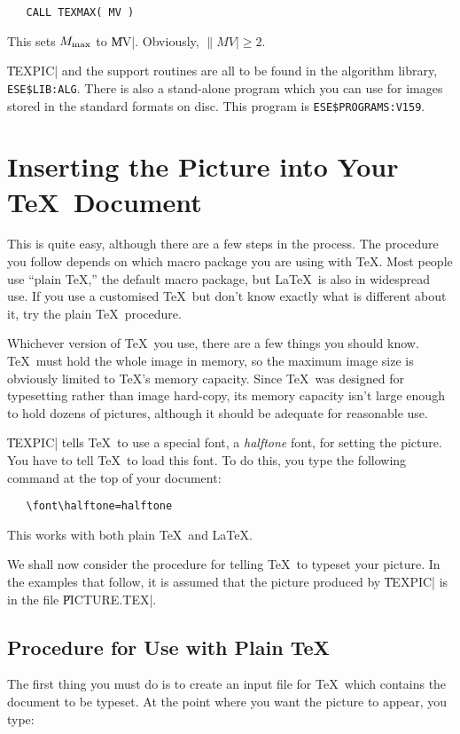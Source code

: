 \begin{verbatim}
   CALL TEXMAX( MV )
\end{verbatim}

\noindent This sets $M_{\hbox{\scriptsize max}}$ to \|MV|. Obviously, $\|MV| \ge 2$.

\|TEXPIC| and the support routines are all to be found in the algorithm
library, \verb|ESE$LIB:ALG|. 
There is also a stand-alone program which you can use for images stored in the
standard formats on disc. This program is \verb"ESE$PROGRAMS:V159". 


\section{Inserting the Picture into Your \TeX\ Document}

This is quite easy, although there are a few steps in the process.
The procedure you follow depends on which macro package you are using with
\TeX. Most people use ``plain \TeX,'' the default macro package, but \LaTeX\
is also in widespread use. If you use a customised \TeX\ but don't know exactly
what is different about it, try the plain \TeX\ procedure.

Whichever version of \TeX\ you use, there are a few things you should know.
\TeX\ must hold the whole image in memory, so the maximum image size is
obviously limited to \TeX's memory capacity. Since \TeX\ was designed for
typesetting rather than image hard-copy, its memory capacity isn't
large enough to hold dozens of pictures, although it should be adequate
for reasonable use.

\|TEXPIC| tells \TeX\ to use a special font, a {\em halftone\/} font, for
setting the picture. You have to tell \TeX\ to load this font. To do this,
you type the following command at the top of your document:

\begin{verbatim}                                          
   \font\halftone=halftone
\end{verbatim}

\noindent This works with both plain \TeX\ and \LaTeX.

We shall now consider the procedure for telling \TeX\ to typeset your picture.
In the examples that follow, it is assumed that the picture produced by
\|TEXPIC| is in the file \|PICTURE.TEX|.

\subsection{Procedure for Use with Plain \TeX}
The first thing you must do is to create an input file for \TeX\ which contains
the document to be typeset. At the point where you want the picture to
appear, you type:

